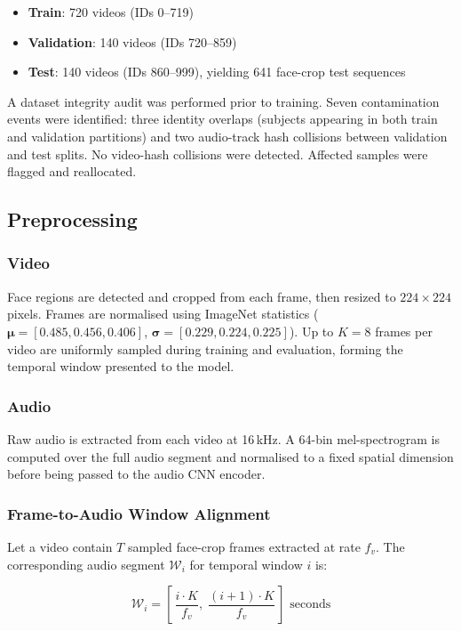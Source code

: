 \documentclass[conference]{IEEEtran}
\begin{document}
\begin{itemize}
  \item \textbf{Train}: 720 videos (IDs 0--719)
  \item \textbf{Validation}: 140 videos (IDs 720--859)
  \item \textbf{Test}: 140 videos (IDs 860--999), yielding 641 face-crop test sequences
\end{itemize}

A dataset integrity audit was performed prior to training. Seven contamination events 
were identified: three identity overlaps (subjects appearing in both train and validation 
partitions) and two audio-track hash collisions between validation and test splits. 
No video-hash collisions were detected. Affected samples were flagged and reallocated.

\subsection{Preprocessing}
\label{sec:preprocessing}

\subsubsection{Video}
Face regions are detected and cropped from each frame, then resized to $224 \times 224$ 
pixels. Frames are normalised using ImageNet statistics 
($\boldsymbol{\mu} = [0.485, 0.456, 0.406]$, $\boldsymbol{\sigma} = [0.229, 0.224, 0.225]$). 
Up to $K = 8$ frames per video are uniformly sampled during training and evaluation, 
forming the temporal window presented to the model.

\subsubsection{Audio}
Raw audio is extracted from each video at 16\,kHz. A 64-bin mel-spectrogram is computed 
over the full audio segment and normalised to a fixed spatial dimension before being passed 
to the audio CNN encoder.

\subsubsection{Frame-to-Audio Window Alignment}
Let a video contain $T$ sampled face-crop frames extracted at rate $f_v$. 
The corresponding audio segment $\mathcal{W}_i$ for temporal window $i$ is:

\begin{equation}
  \mathcal{W}_i = \left[\,\frac{i \cdot K}{f_v},\; \frac{(i+1) \cdot K}{f_v}\,\right] \text{ seconds}
  \label{eq:alignment}
\end{equation}
\end{document}
